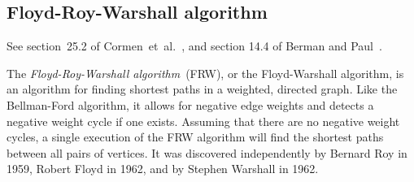


\subsection{Floyd-Roy-Warshall algorithm}

See section~25.2 of Cormen~et~al.~\cite{CormenEtAl2001}, and section
14.4 of Berman and Paul~\cite{BermanPaul1997}.

The \emph{Floyd-Roy-Warshall algorithm}~(FRW), or the Floyd-Warshall
algorithm, is an algorithm for finding shortest paths in a weighted,
directed graph. Like the Bellman-Ford algorithm, it allows for
negative edge weights and detects a negative weight cycle if one
exists. Assuming that there are no negative weight cycles, a single
execution of the FRW algorithm will find the shortest paths between
all pairs of vertices. It was discovered independently by Bernard Roy
in 1959, Robert Floyd in 1962, and by Stephen Warshall in 1962.

